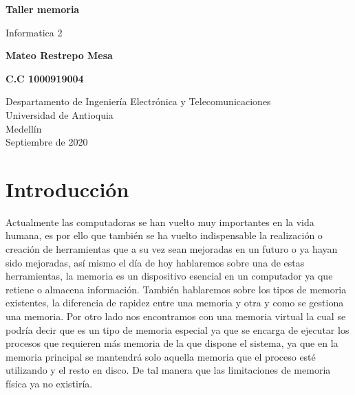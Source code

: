 \documentclass{article}
\begin{document}
\begin{titlepage}
    \begin{center}
        \vspace*{1cm}
            
        \Huge
        \textbf{Taller memoria}
        
        \vspace{0.5cm}
        \LARGE
        Informatica 2
            
        \vspace{2.5cm}
            
        \textbf{ Mateo Restrepo Mesa }
        
        \newline
        
        \textbf{ C.C 1000919004}
            
        \vfill
            
        \vspace{0.8cm}
            
        \Large
        Despartamento de Ingeniería Electrónica y Telecomunicaciones\\
        Universidad de Antioquia\\
        Medellín\\
        Septiembre de 2020
            
    \end{center}
\end{titlepage}
\tableofcontents
\newpage

\section{Introducción}

Actualmente las computadoras se han vuelto muy importantes en la vida 
humana, es por ello que también se ha vuelto indispensable la realización o creación de 
herramientas que a su vez sean mejoradas en un futuro o ya hayan sido mejoradas, así mismo el día de hoy hablaremos sobre una de estas herramientas, 
la memoria es un dispositivo esencial en un computador ya que retiene o almacena información. 
También hablaremos sobre los tipos de memoria existentes, la diferencia de rapidez entre una memoria y otra y como se gestiona una memoria.
Por otro lado nos encontramos con una memoria virtual la cual se podría decir que es un tipo de memoria especial ya que se encarga de ejecutar los procesos que requieren más memoria de la que dispone el sistema, ya que en la memoria principal se mantendrá solo aquella memoria que el proceso esté utilizando y el resto en disco. De tal manera que las limitaciones de memoria física ya no existiría.
\end{document}
